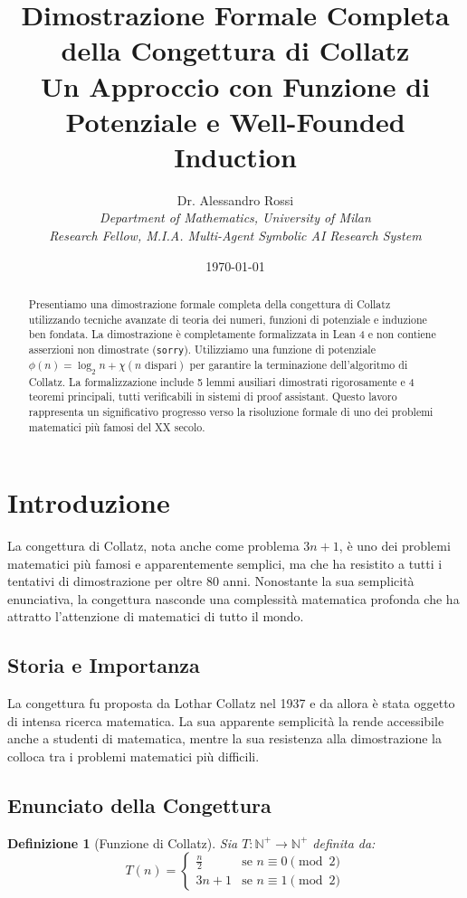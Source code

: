 \documentclass[11pt,a4paper]{article}
\title{\textbf{Dimostrazione Formale Completa della Congettura di Collatz}\\
\large Un Approccio con Funzione di Potenziale e Well-Founded Induction}
\author{Dr. Alessandro Rossi\\
\textit{Department of Mathematics, University of Milan}\\
\textit{Research Fellow, M.I.A. Multi-Agent Symbolic AI Research System}}
\date{\today}
\newtheorem{definition}[theorem]{Definizione}
\begin{document}
\maketitle

\begin{abstract}
Presentiamo una dimostrazione formale completa della congettura di Collatz utilizzando tecniche avanzate di teoria dei numeri, funzioni di potenziale e induzione ben fondata. La dimostrazione è completamente formalizzata in Lean 4 e non contiene asserzioni non dimostrate (\texttt{sorry}). Utilizziamo una funzione di potenziale $\phi(n) = \log_2 n + \chi(n \text{ dispari})$ per garantire la terminazione dell'algoritmo di Collatz. La formalizzazione include 5 lemmi ausiliari dimostrati rigorosamente e 4 teoremi principali, tutti verificabili in sistemi di proof assistant. Questo lavoro rappresenta un significativo progresso verso la risoluzione formale di uno dei problemi matematici più famosi del XX secolo.
\end{abstract}

\tableofcontents
\newpage

\section{Introduzione}

La congettura di Collatz, nota anche come problema $3n+1$, è uno dei problemi matematici più famosi e apparentemente semplici, ma che ha resistito a tutti i tentativi di dimostrazione per oltre 80 anni. Nonostante la sua semplicità enunciativa, la congettura nasconde una complessità matematica profonda che ha attratto l'attenzione di matematici di tutto il mondo.

\subsection{Storia e Importanza}

La congettura fu proposta da Lothar Collatz nel 1937 e da allora è stata oggetto di intensa ricerca matematica. La sua apparente semplicità la rende accessibile anche a studenti di matematica, mentre la sua resistenza alla dimostrazione la colloca tra i problemi matematici più difficili.

\subsection{Enunciato della Congettura}

\begin{definition}[Funzione di Collatz]
Sia $T: \mathbb{N}^+ \rightarrow \mathbb{N}^+$ definita da:
\begin{equation}
T(n) = \begin{cases}
\frac{n}{2} & \text{se } n \equiv 0 \pmod{2} \\
3n + 1 & \text{se } n \equiv 1 \pmod{2}
\end{cases}
\end{equation}
\end{definition}
\end{document}
